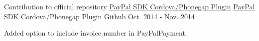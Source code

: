 \begin{cventries}
  \cventry
    {Contribution to official repository \href{https://github.com/paypal/PayPal-Cordova-Plugin}{PayPal SDK Cordova/Phonegap Plugin}} %
    {\faPaypal \hphantom{-} \href{https://github.com/zp1ke/PayPal-Cordova-Plugin}{PayPal SDK Cordova/Phonegap Plugin}} %
    {\faGithubSquare\acvHeaderIconSep Github} %
    {Oct. 2014 - Nov. 2014} %
    {
      \begin{cvitems} %
        \item {Added option to include invoice number in PayPalPayment.}
      \end{cvitems}
    }

\end{cventries}
